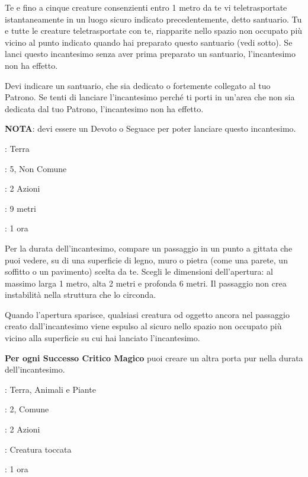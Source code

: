 \begin{multicols}{2}
Te e fino a cinque creature consenzienti entro 1 metro da te vi teletrasportate istantaneamente in un luogo sicuro indicato precedentemente, detto santuario. Tu e tutte le creature teletrasportate con te, riapparite nello spazio non occupato più vicino al punto indicato quando hai preparato questo santuario (vedi sotto). Se lanci questo incantesimo senza aver prima preparato un santuario, l'incantesimo non ha effetto.

Devi indicare un santuario, che sia dedicato o fortemente collegato al tuo Patrono. Se tenti di lanciare l'incantesimo perché ti porti in un'area che non sia dedicata dal tuo Patrono, l'incantesimo non ha effetto.

\textbf{NOTA}: devi essere un Devoto o Seguace per poter lanciare questo incantesimo.

\noindent\colorbox{OBSSgold!10}{
\begin{minipage}{0.95\linewidth}
\begin{description}[noitemsep, topsep=0pt, parsep=0pt, partopsep=0pt, leftmargin=0cm, labelwidth=1.3cm]
	\item[\textbf{Lista}]: Terra
	\item[\textbf{Livello}]: 5, Non Comune
	\item[\textbf{Lancio}]: 2 Azioni
	\item[\textbf{Gittata}]: 9 metri
	\item[\textbf{Durata}]: 1 ora
\end{description}
\end{minipage}}\smallskip

Per la durata dell'incantesimo, compare un passaggio in un punto a gittata che puoi vedere, su di una superficie di legno, muro o pietra (come una parete, un soffitto o un pavimento) scelta da te. Scegli le dimensioni dell'apertura: al massimo larga 1 metro, alta 2 metri e profonda 6 metri. Il passaggio non crea instabilità nella struttura che lo circonda.

Quando l'apertura sparisce, qualsiasi creatura od oggetto ancora nel passaggio creato dall'incantesimo viene espulso al sicuro nello spazio non occupato più vicino alla superficie su cui hai lanciato l'incantesimo.

\textbf{Per ogni Successo Critico Magico} puoi creare un altra porta pur nella durata dell'incantesimo.

\noindent\colorbox{OBSSgold!10}{
\begin{minipage}{0.95\linewidth}
\begin{description}[noitemsep, topsep=0pt, parsep=0pt, partopsep=0pt, leftmargin=0cm, labelwidth=1.3cm]
	\item[\textbf{Lista}]: Terra, Animali e Piante
	\item[\textbf{Livello}]: 2, Comune
	\item[\textbf{Lancio}]: 2 Azioni
	\item[\textbf{Gittata}]: Creatura toccata
	\item[\textbf{Durata}]: 1 ora
\end{description}
\end{minipage}}\smallskip


\end{multicols}
